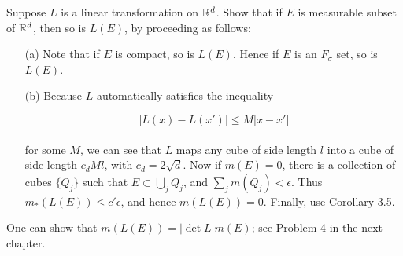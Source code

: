\documentclass[12pt, a4paper, openany, twoside]{book}
\theoremstyle{definition}
\theoremstyle{remark}
\theoremstyle{plain}
\numberwithin{equation}{section}
\begin{document}
\begin{tcolorbox}[colback=yellow!10!white,colframe=gray!75!black,title=Exercise 1.8]\label{Exercise 1.8}
    Suppose $L$ is a linear transformation on ${\mathbb {R}}^d$. Show that if $E$ is measurable subset of ${\mathbb {R}}^d$, then so is $L(E)$, by proceeding as follows:
    \vspace{5mm}
    \begin{enumerate}
        \item [(a)] Note that if $E$ is compact, so is $L(E)$. Hence if $E$ is an $F_\sigma$ set, so is $L(E)$.
        \item [(b)] Because $L$ automatically satisfies the inequality 

        \[|L(x)-L(x')|\leq M|x-x'|\]
        \\
        for some $M$, we can see that $L$ maps any cube of side length $l$ into a cube of side length $c_d Ml$, with $c_d=2\sqrt{d}$. Now if $m(E)=0$, there is a collection of cubes $\{Q_j\}$ such that $E\subset\bigcup_{j}{Q_j}$, and $\sum_{j}{m(Q_j)}<\epsilon$. Thus $m_*{(L(E))}\leq c'\epsilon$, and hence $m(L(E))=0$. Finally, use Corollary 3.5. 
    \end{enumerate}
    \vspace{5mm}
    One can show that $m(L(E))=|\det{L}|m(E)$; see Problem 4 in the next chapter.
\end{tcolorbox}
\end{document}
